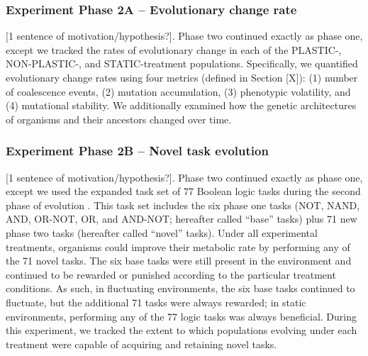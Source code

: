 
\subsubsection{Experiment Phase 2A -- Evolutionary change rate}

[1 sentence of motivation/hypothesis?].
Phase two continued exactly as phase one, except we tracked the rates of evolutionary change in each of the PLASTIC-, NON-PLASTIC-, and STATIC-treatment populations. 
Specifically, we quantified evolutionary change rates using four metrics (defined in Section [X]):
(1) number of coalescence events,
(2) mutation accumulation, 
(3) phenotypic volatility,
and (4) mutational stability.
We additionally examined how the genetic architectures of organisms and their ancestors changed over time.  

\subsubsection{Experiment Phase 2B -- Novel task evolution}

[1 sentence of motivation/hypothesis?].
Phase two continued exactly as phase one, except we used the expanded task set of 77 Boolean logic tasks during the second phase of evolution \citep{ofria_avida:_2009}.
This task set includes the six phase one tasks (NOT, NAND, AND, OR-NOT, OR, and AND-NOT; hereafter called ``base'' tasks) plus 71 new phase two tasks (hereafter called ``novel'' tasks).
Under all experimental treatments, organisms could improve their metabolic rate by performing any of the 71 novel tasks.
The six base tasks were still present in the environment and continued to be rewarded or punished according to the particular treatment conditions.
As such, in fluctuating environments, the six base tasks continued to fluctuate, but the additional 71 tasks were always rewarded; in static environments, performing any of the 77 logic tasks was always beneficial.
During this experiment, we tracked the extent to which populations evolving under each treatment were capable of acquiring and retaining novel tasks.  

